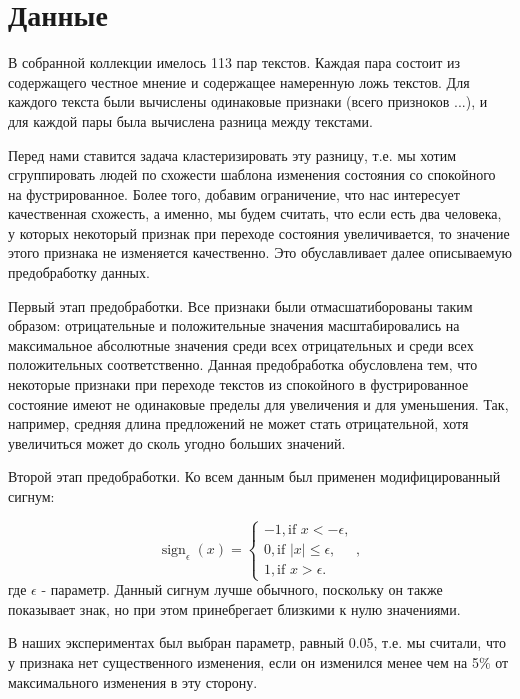 \documentclass[12pt]{article}
\DeclareMathOperator{\sign}{sign}
\begin{document}
\section{Данные}

В собранной коллекции имелось 113 пар текстов. Каждая пара состоит из содержащего честное мнение и  содержащее намеренную ложь текстов. Для каждого текста были вычислены одинаковые признаки (всего призноков ...), и для каждой пары была вычислена разница между текстами.

Перед нами ставится задача кластеризировать эту разницу, т.е. мы хотим сгруппировать людей по схожести шаблона изменения состояния со спокойного на фустрированное. Более того, добавим ограничение, что нас интересует качественная схожесть, а именно, мы будем считать, что если есть два человека, у которых некоторый признак при переходе состояния увеличивается, то значение этого признака не изменяется качественно. Это обуславливает далее описываемую предобработку данных.

Первый этап предобработки. Все признаки были отмасшатиборованы таким образом: отрицательные и положительные значения масштабировались на максимальное абсолютные значения среди всех отрицательных и среди всех положительных соответственно. Данная предобработка обусловлена тем, что некоторые признаки при переходе текстов из спокойного в фустрированное состояние имеют не одинаковые пределы для увеличения и для уменьшения. Так, например, средняя длина предложений не может стать отрицательной, хотя увеличиться может до сколь угодно больших значений. 

Второй этап предобработки. Ко всем данным был применен модифицированный сигнум:

\begin{equation*}
\sign_\epsilon(x) = 
 \begin{cases}
   -1, \text{if } x < -\epsilon,\\
   0, \text{if } |x| \leq \epsilon,\\
   1, \text{if } x > \epsilon.
 \end{cases}
 ,
\end{equation*}
где $\epsilon$ - параметр. Данный сигнум лучше обычного, поскольку он также показывает знак, но при этом принебрегает близкими к нулю значениями.

В наших экспериментах был выбран параметр, равный 0.05, т.е. мы считали, что у признака нет существенного изменения, если он изменился менее чем на 5$\%$ от максимального изменения в эту сторону.
\end{document}
